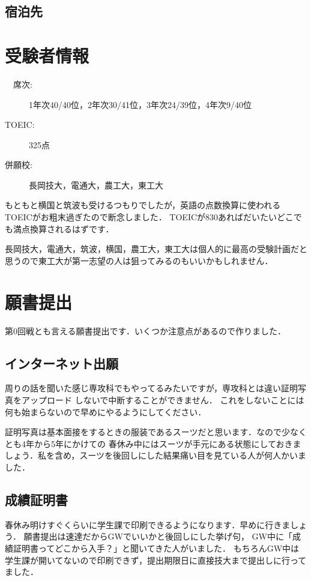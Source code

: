\documentclass[dvipdfmx]{jsarticle}
\begin{document}
\subsection{宿泊先}
\subsubsection*{}


\section{受験者情報}
\begin{description}
  \item[ 　席次:] 1年次40/40位，2年次30/41位，3年次24/39位，4年次9/40位
  \item[TOEIC:] 325点
  \item[ 併願校:] 長岡技大，電通大，農工大，東工大
\end{description}

もともと横国と筑波も受けるつもりでしたが，英語の点数換算に使われるTOEICがお粗末過ぎたので断念しました．
TOEICが830あればだいたいどこでも満点換算されるはずです．

長岡技大，電通大，筑波，横国，農工大，東工大は個人的に最高の受験計画だと思うので東工大が第一志望の人は狙ってみるのもいいかもしれません．

\section{願書提出}
第0回戦とも言える願書提出です．いくつか注意点があるので作りました．

\subsection{インターネット出願}
周りの話を聞いた感じ専攻科でもやってるみたいですが，専攻科とは違い証明写真をアップロード
しないで中断することができません．
これをしないことには何も始まらないので早めにやるようにしてください．

証明写真は基本面接をするときの服装であるスーツだと思います．なので少なくとも4年から5年にかけての
春休み中にはスーツが手元にある状態にしておきましょう．私を含め，スーツを後回しにした結果痛い目を見ている人が何人かいました．

\subsection{成績証明書}
春休み明けすぐくらいに学生課で印刷できるようになります．早めに行きましょう．
願書提出は速達だからGWでいいかと後回しにした挙げ句，
GW中に「成績証明書ってどこから入手？」と聞いてきた人がいました．
もちろんGW中は学生課が開いてないので印刷できず，提出期限日に直接技大まで提出しに行ってました．
\end{document}

